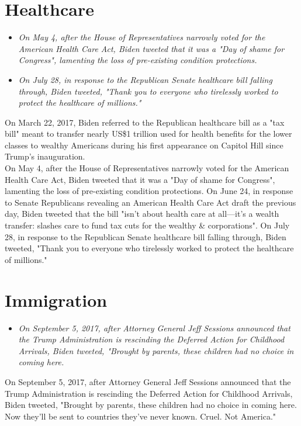 \section{Healthcare}\label{healthcare}

\begin{itemize}
\item
  \emph{On May 4, after the House of Representatives narrowly voted for
  the American Health Care Act, Biden tweeted that it was a "Day of
  shame for Congress", lamenting the loss of pre-existing condition
  protections.}
\item
  \emph{On July 28, in response to the Republican Senate healthcare bill
  falling through, Biden tweeted, "Thank you to everyone who tirelessly
  worked to protect the healthcare of millions."}
\end{itemize}

On March 22, 2017, Biden referred to the Republican healthcare bill as a
"tax bill" meant to transfer nearly US\$1 trillion used for health
benefits for the lower classes to wealthy Americans during his first
appearance on Capitol Hill since Trump's inauguration.\\
On May 4, after the House of Representatives narrowly voted for the
American Health Care Act, Biden tweeted that it was a "Day of shame for
Congress", lamenting the loss of pre-existing condition protections. On
June 24, in response to Senate Republicans revealing an American Health
Care Act draft the previous day, Biden tweeted that the bill "isn't
about health care at all---it's a wealth transfer: slashes care to fund
tax cuts for the wealthy \& corporations". On July 28, in response to
the Republican Senate healthcare bill falling through, Biden tweeted,
"Thank you to everyone who tirelessly worked to protect the healthcare
of millions."

\section{Immigration}\label{immigration}

\begin{itemize}
\item
  \emph{On September 5, 2017, after Attorney General Jeff Sessions
  announced that the Trump Administration is rescinding the Deferred
  Action for Childhood Arrivals, Biden tweeted, "Brought by parents,
  these children had no choice in coming here.}
\end{itemize}

On September 5, 2017, after Attorney General Jeff Sessions announced
that the Trump Administration is rescinding the Deferred Action for
Childhood Arrivals, Biden tweeted, "Brought by parents, these children
had no choice in coming here. Now they'll be sent to countries they've
never known. Cruel. Not America."

